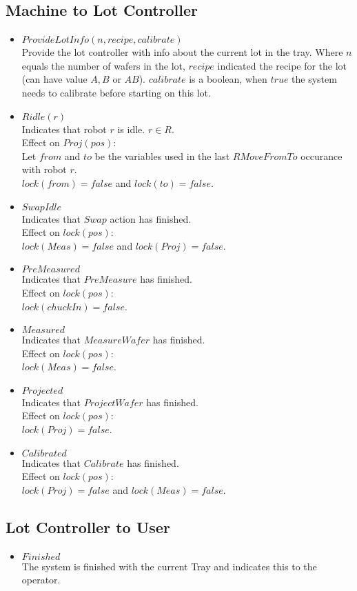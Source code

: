\subsection{Machine to Lot Controller}
\begin{itemize}
\item $ProvideLotInfo(n, recipe, calibrate)$
\\Provide the lot controller with info about the current lot in the tray. Where $n$ equals the number of wafers in the lot, $recipe$ indicated the recipe for the lot (can have value $A, B$ or $AB$). $calibrate$ is a boolean, when $true$ the system needs to calibrate before starting on this lot.
\item $Ridle(r)$
\\Indicates that robot $r$ is idle. $r \in R$.\\
Effect on $Proj(pos)$:\\
Let $from$ and $to$ be the variables used in the last $RMoveFromTo$ occurance with robot $r$.\\
$lock(from) = false$ and $lock(to) = false$.
\item $SwapIdle$
\\Indicates that $Swap$ action has finished.
\\Effect on $lock(pos)$:\\
$lock(Meas) = false$ and $lock(Proj) = false$.\\
\item $PreMeasured$
\\Indicates that $PreMeasure$ has finished.\\
Effect on $lock(pos)$:\\
$lock(chuckIn) = false$.\\
\item $Measured$
\\Indicates that $MeasureWafer$ has finished.\\
Effect on $lock(pos)$:\\
$lock(Meas) = false$.\\
\item $Projected$
\\Indicates that $ProjectWafer$ has finished.\\
Effect on $lock(pos)$:\\
$lock(Proj) = false$.\\
\item $Calibrated$
\\Indicates that $Calibrate$ has finished.\\
Effect on $lock(pos)$:\\
$lock(Proj) = false$ and $lock(Meas) = false$.\\
\end{itemize}

\subsection{Lot Controller to User}
\begin{itemize}
\item $Finished$
\\The system is finished with the current Tray and indicates this to the operator.
\end{itemize}
